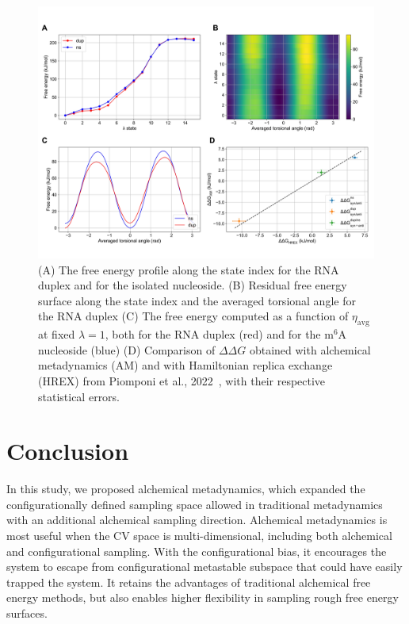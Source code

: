 \documentclass[journal=jacsat,manuscript=article]{achemso}
\begin{document}
\begin{figure}[H]
    \centering
    \includegraphics[width=\textwidth]{Figures/m6A_results.jpg}   
    \caption{(A) The free energy profile along the state index for the RNA duplex and for the isolated nucleoside. (B) Residual free energy surface along the state index and the averaged torsional angle for the RNA duplex (C) The free energy computed as a function of $\eta_{\text{avg}}$ at fixed $\lambda=1$, both for the RNA duplex (red) and for the m$^6$A nucleoside (blue) (D) Comparison of $\Delta \Delta G$ obtained with alchemical metadynamics (AM) and with Hamiltonian replica exchange (HREX) from Piomponi et al., 2022~\cite{piomponi2022molecular}, with their respective statistical errors.}
    \label{m6A_results}
\end{figure}

\section{Conclusion}
In this study, we proposed alchemical metadynamics, which expanded the configurationally defined sampling space allowed in traditional metadynamics with an additional alchemical sampling direction. Alchemical metadynamics is most useful when the CV space is multi-dimensional, including both alchemical and configurational sampling. With the configurational bias, it encourages the system to escape from configurational metastable subspace that could have easily trapped the system. It retains the advantages of traditional alchemical free energy methods, but also enables higher flexibility in sampling rough free energy surfaces. 
\end{document}
